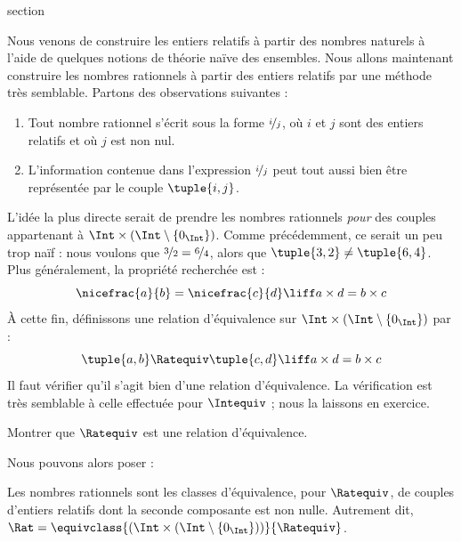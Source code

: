 \documentclass[11pt,a4paper,openany]{memoir}
\begin{document}
\begingroup
\expandafter\def\csname ol@sectioncs\endcsname{section}
\def\olfilename{rationals}



Nous venons de construire les entiers relatifs à partir des nombres naturels
à l'aide de quelques notions de théorie naïve des ensembles. Nous allons
maintenant construire les nombres rationnels à partir des entiers relatifs
par une méthode très semblable. Partons des observations suivantes :
\begin{enumerate}
	\item Tout nombre rationnel s'écrit sous la forme $\nicefrac{i}{j}$,
	où $i$ et $j$ sont des entiers relatifs et où $j$ est non nul.
	\item L'information contenue dans l'expression $\nicefrac{i}{j}$
	peut tout aussi bien être représentée par le couple $\tuple{ i, j}$.
\end{enumerate}
L'idée la plus directe serait de prendre les nombres rationnels \emph{pour}
des couples appartenant à $\Int \times (\Int \setminus \{0_\Int\})$.
Comme précédemment, ce serait un peu trop naïf : nous voulons que
$\nicefrac{3}{2} = \nicefrac{6}{4}$, alors que $\tuple{ 3, 2}\neq \tuple{ 6,
4}$. Plus généralement, la propriété recherchée est :
\[
	\nicefrac{a}{b} = \nicefrac{c}{d} \liff a \times d = b \times c
\]
À cette fin, définissons une {relation d'équivalence} sur $\Int \times
(\Int \setminus \{0_\Int\})$ par :
\[
	\tuple{ a, b }\Ratequiv \tuple{ c, d} \liff a \times d = b \times c
\]
Il faut vérifier qu'il s'agit bien d'une relation d'équivalence. La vérification
est très semblable à celle effectuée pour $\Intequiv$ ; nous la laissons en exercice.
\begin{prob}
Montrer que $\Ratequiv$ est une relation d'équivalence.
\end{prob}
Nous pouvons alors poser :
\begin{defn}
Les nombres rationnels sont les classes d'équivalence, pour $\Ratequiv$, de couples
d'entiers relatifs dont la seconde composante est non nulle. Autrement dit,
$\Rat = \equivclass{(\Int \times (\Int\setminus \{0_\Int\}))}{\Ratequiv}$.
\end{defn}
\end{document}
